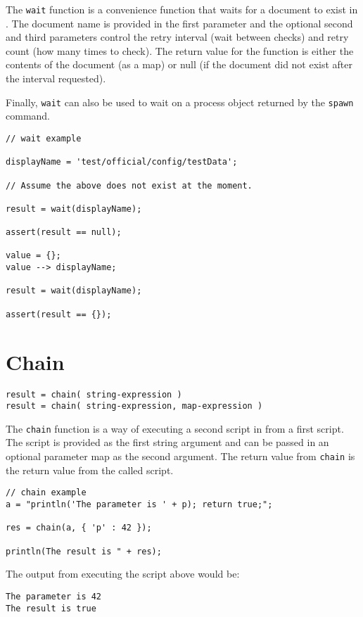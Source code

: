 The \Verb+wait+ function is a convenience function that waits for a document to exist in \Rapture. The document name is provided in the first parameter and the optional second and third parameters control the retry interval (wait between checks) and retry count (how many times to check). The return value for the function is either the contents of the document (as a map) or null (if the document did not exist after the interval requested). 

Finally, \Verb+wait+ can also be used to wait on a process object returned by the \verb+spawn+ command.

\begin{lstlisting}[caption={Wait example}]
// wait example

displayName = 'test/official/config/testData';

// Assume the above does not exist at the moment.

result = wait(displayName);

assert(result == null);

value = {};
value --> displayName;

result = wait(displayName);

assert(result == {});
\end{lstlisting}

\section{Chain}

\begin{Verbatim}
result = chain( string-expression )
result = chain( string-expression, map-expression )
\end{Verbatim}

The \Verb+chain+ function is a way of executing a second script in \Reflex from a first script. The script is provided as the first string argument and can be passed in an optional parameter map as the second argument. The return value from \verb+chain+ is the return value from the called script.

\begin{lstlisting}[caption={Chain example}]
// chain example
a = "println('The parameter is ' + p); return true;";

res = chain(a, { 'p' : 42 });

println(The result is " + res);

\end{lstlisting}

The output from executing the script above would be:
\begin{Verbatim}
The parameter is 42
The result is true
\end{Verbatim}

